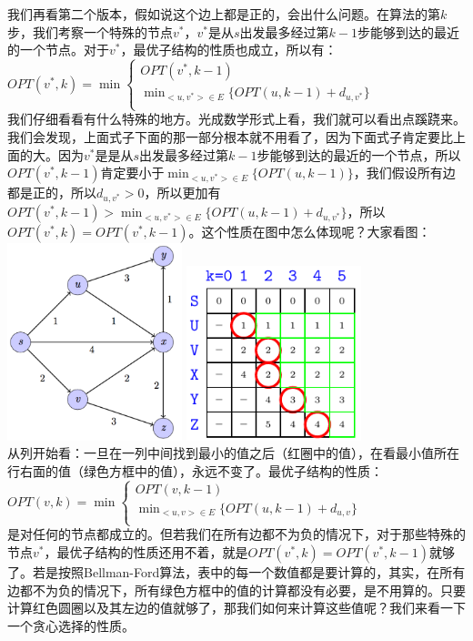 	 我们再看第二个版本，假如说这个边上都是正的，会出什么问题。在算法的第$k$步，我们考察一个特殊的节点$v^\ast$，$v^\ast$是从$s$出发最多经过第$k-1$步能够到达的最近的一个节点。对于$v^\ast$，最优子结构的性质也成立，所以有：\\
	  $OPT(v^\ast, k) = \min \begin{cases} 
	  OPT( v^\ast, k-1 ) \\
	  {\min_{<u,v^\ast>\in E}} \{ OPT( u, k-1) + d_{u, v^\ast}  \} \\
	  \end{cases}  $\\
	 我们仔细看看有什么特殊的地方。光成数学形式上看，我们就可以看出点蹊跷来。我们会发现，上面式子下面的那一部分根本就不用看了，因为下面式子肯定要比上面的大。因为$v^\ast$是是从$s$出发最多经过第$k-1$步能够到达的最近的一个节点，所以$OPT( v^\ast, k-1 ) $肯定要小于${\min_{<u,v^\ast>\in E}} \{ OPT( u, k-1)\} $，我们假设所有边都是正的，所以$d_{u, v^\ast}>0$，所以更加有$OPT( v^\ast, k-1 )>{\min_{<u,v^\ast>\in E}} \{ OPT( u, k-1) + d_{u, v^\ast}  \}$，所以$OPT(v^\ast, k) = OPT( v^\ast, k-1 ) $。这个性质在图中怎么体现呢？大家看图：\\
	 \includegraphics[width=2in]{L7-shortestpathexample.png}
	 \includegraphics[width=2in]{L7-Dijkstraexample.png}\\
	 从列开始看：一旦在一列中间找到最小的值之后（红圈中的值），在看最小值所在行右面的值（绿色方框中的值），永远不变了。最优子结构的性质： $OPT(v, k) = \min \begin{cases} 
	 OPT( v, k-1 ) \\
	 {\min_{<u,v>\in E}} \{ OPT( u, k-1) + d_{u, v}  \} \\
	 \end{cases}  $\\
	 是对任何的节点都成立的。但若我们在所有边都不为负的情况下，对于那些特殊的节点$v^\ast$，最优子结构的性质还用不着，就是$OPT(v^\ast, k) = OPT( v^\ast, k-1 ) $就够了。若是按照Bellman-Ford算法，表中的每一个数值都是要计算的，其实，在所有边都不为负的情况下，所有绿色方框中的值的计算都没有必要，是不用算的。只要计算红色圆圈以及其左边的值就够了，那我们如何来计算这些值呢？我们来看一下一个贪心选择的性质。
	 
